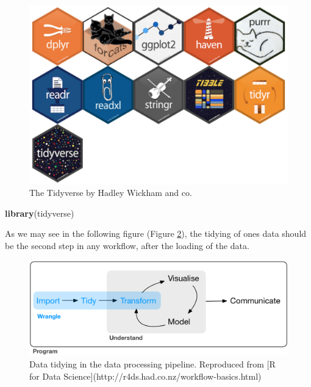 \documentclass[
]{book}
\newenvironment{Shaded}{\begin{snugshade}}{\end{snugshade}}
\newcommand{\KeywordTok}[1]{\textcolor[rgb]{0.13,0.29,0.53}{\textbf{#1}}}
\newcommand{\NormalTok}[1]{#1}
\begin{document}
\begin{figure}

{\centering \includegraphics[width=1\linewidth]{figures/tidyverse} 

}

\caption{The Tidyverse by Hadley Wickham and co.}\label{fig:tidyverse}
\end{figure}

\begin{Shaded}
\begin{Highlighting}[]
\KeywordTok{library}\NormalTok{(tidyverse)}
\end{Highlighting}
\end{Shaded}

As we may see in the following figure (Figure \ref{fig:tidy}), the tidying of ones data should be the second step in any workflow, after the loading of the data.

\begin{figure}

{\centering \includegraphics[width=1\linewidth]{figures/data-science-wrangle} 

}

\caption{Data tidying in the data processing pipeline. Reproduced from [R for Data Science](http://r4ds.had.co.nz/workflow-basics.html)}\label{fig:tidy}
\end{figure}
\end{document}
